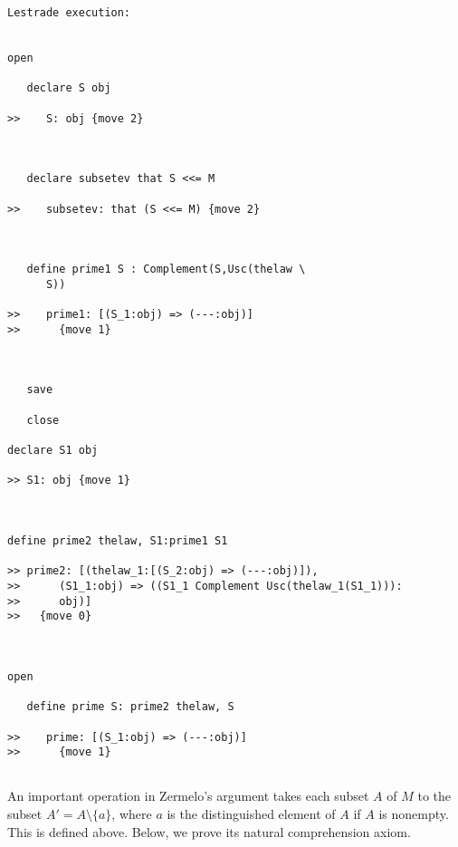 \documentclass[12pt]{article}
\begin{document}
\begin{verbatim}Lestrade execution:


open

   declare S obj

>>    S: obj {move 2}



   declare subsetev that S <<= M

>>    subsetev: that (S <<= M) {move 2}



   define prime1 S : Complement(S,Usc(thelaw \
      S))

>>    prime1: [(S_1:obj) => (---:obj)]
>>      {move 1}



   save

   close

declare S1 obj

>> S1: obj {move 1}



define prime2 thelaw, S1:prime1 S1

>> prime2: [(thelaw_1:[(S_2:obj) => (---:obj)]),
>>      (S1_1:obj) => ((S1_1 Complement Usc(thelaw_1(S1_1))):
>>      obj)]
>>   {move 0}



open

   define prime S: prime2 thelaw, S

>>    prime: [(S_1:obj) => (---:obj)]
>>      {move 1}


\end{verbatim}

An important operation in Zermelo's argument takes each subset $A$ of $M$ to the subset $A' = A \setminus \{a\}$, where $a$ is the distinguished element of $A$ if
$A$ is nonempty.  This is defined above.  Below, we prove its natural comprehension axiom.
\end{document}
